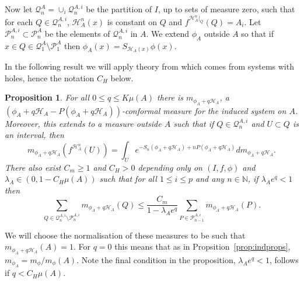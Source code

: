 \documentclass[11pt, reqno]{amsart}
\numberwithin{equation}{section}
\theoremstyle{plain}%
\newtheorem{prop}[thm]{Proposition}
\theoremstyle{definition}
\def\N{\ensuremath{\mathbb N}}
\def\Q{\ensuremath{\mathcal Q}}
\def\P{\ensuremath{\mathcal P}}
\def\n{\ensuremath{n}}
\def\sm{\setminus}
\renewcommand{\H}{\mathcal{H}}
\theoremstyle{nonumberplain}
\begin{document}
Now let $\Q^A_n=\cup_i \Q^{A, i}_n$ be the partition of $I$, up to sets of measure zero, such that for each $Q\in \Q^{A, i}_n$, $\H_A^n(x)$ is constant on $Q$ and $f^{\H_A^n|_Q}(Q) =A_i$.  Let $\P^{A, i}_n\subset \P_n^A$ be the elements of $ \Q^{A, i}_n$  in $A$.  We extend $\phi_A$ outside $A$ so that if $x\in Q\in  \Q^{A}_1\sm \P_1^A$ then $\phi_A(x) = S_{\H_A(x)}\phi(x)$.

In the following result we will apply theory from \cite{JurTod25} which comes from systems with holes, hence the notation $C_H$ below.

\begin{prop}
For all $0\le q\le K\mu(A)$ there is $m_{\phi_A+q\H_A}$, a $\left(\phi_A+q\H_A-P\left(\phi_A+q\H_A\right)\right)$-conformal measure for the induced system on $A$.  Moreover, this extends to a measure outside $A$ such that if $Q\in \Q^{A, i}_n$ and $U\subset Q$ is an interval, then 
\begin{equation}
m_{\phi_A+q\H_A}(f^{\H_A^n}(U)) = \int_Ue^{-S_n\left(\phi_A+q\H_A\right) + nP\left(\phi_A+q\H_A\right)} dm_{\phi_A+q\H_A}.
\label{eq:confex}
\end{equation}
There also exist $C_m\ge 1$ and $C_H>0$ depending only on $(I, f, \phi)$ and $\lambda_A\in (0, 1-C_H\mu(A))$ such that for all $1\le i\le p$ and any $\n\in \N$,  if $\lambda_Ae^q<1$ then
$$\sum_{Q\in \Q^{A, i}_n\sm \P_n^{A, i}} m_{\phi_A+q\H_A}(Q)\le \frac{C_m}{1-\lambda_Ae^q}  \sum_{P\in \P^{A, i}_{n-1}}m_{\phi_A+q\H_A}(P).$$
\label{prop:conf}
\end{prop}

We will choose the normalisation of these measures to be such that $m_{\phi_A+q\H_A}(A)=1$.  For $q=0$ this means that as in Propsition~\ref{prop:indprops},  $m_{\phi_A} = m_\phi/m_\phi(A)$.   Note the final condition in the proposition, $\lambda_Ae^q<1$, follows if $q<C_H\mu(A)$.
\end{document}

